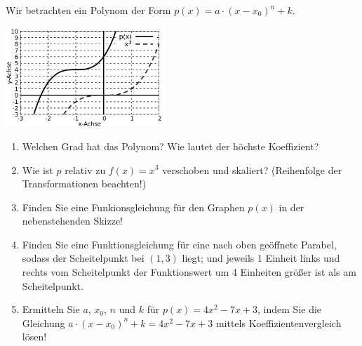 \item Wir betrachten ein Polynom der Form $p(x) = a\cdot \left(x-x_0\right)^n+k$.

\begin{multicols}{2}
  \includegraphics[width=0.45\textwidth]{../tex-snippets/ex-fn-transform-2-a.png}

\begin{enumerate}
\item Welchen Grad hat das Polynom? Wie lautet der höchste Koeffizient?
\item Wie ist $p$ relativ zu $f(x)=x^3$ verschoben und skaliert? (Reihenfolge der Transformationen beachten!)
\item Finden Sie eine Funkionsgleichung für den Graphen $p(x)$ in der nebenstehenden Skizze! 
\item Finden Sie eine Funktionsgleichung für eine nach oben geöffnete Parabel, sodass der Scheitelpunkt bei $(1,3)$ liegt; und jeweils 1 Einheit links und rechts vom Scheitelpunkt der Funktionswert um 4 Einheiten größer ist als am Scheitelpunkt.
\item Ermitteln Sie $a$, $x_0$, $n$ und $k$ für $p(x)=4x^2-7x+3$, indem Sie die Gleichung $a\cdot \left(x-x_0\right)^n+k = 4x^2-7x+3$ mittels Koeffizientenvergleich lösen!
\end{enumerate}

\end{multicols}

